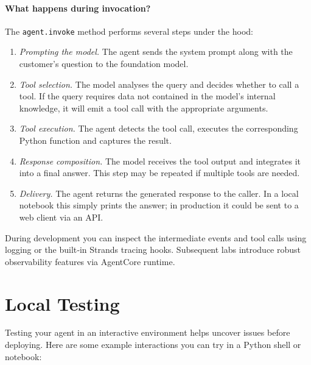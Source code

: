 \paragraph{What happens during invocation?}  The \texttt{agent.invoke}
method performs several steps under the hood:

\begin{enumerate}
  \item \emph{Prompting the model.}  The agent sends the system prompt
        along with the customer's question to the foundation model.
  \item \emph{Tool selection.}  The model analyses the query and decides whether
        to call a tool.  If the query requires data not contained in the
        model’s internal knowledge, it will emit a tool call with the
        appropriate arguments.
  \item \emph{Tool execution.}  The agent detects the tool call,
        executes the corresponding Python function and captures the result.
  \item \emph{Response composition.}  The model receives the tool output and
        integrates it into a final answer.  This step may be repeated if
        multiple tools are needed.
  \item \emph{Delivery.}  The agent returns the generated response to the
        caller.  In a local notebook this simply prints the answer; in
        production it could be sent to a web client via an API.
\end{enumerate}

During development you can inspect the intermediate events and tool calls
using logging or the built‑in Strands tracing hooks.  Subsequent labs
introduce robust observability features via AgentCore runtime.

\section{Local Testing}

Testing your agent in an interactive environment helps uncover issues before
deploying.  Here are some example interactions you can try in a Python
shell or notebook:

